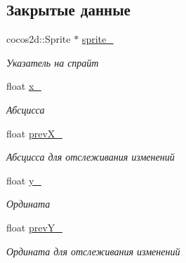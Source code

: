 \subsection*{Закрытые данные}
\begin{DoxyCompactItemize}
\item 
\mbox{\label{classrtm_1_1_world_object_ab371756fde7d223a4ff6fc72d42c9cf0}} 
cocos2d\+::\+Sprite $\ast$ \hyperlink{classrtm_1_1_world_object_ab371756fde7d223a4ff6fc72d42c9cf0}{sprite\+\_\+}
\begin{DoxyCompactList}\small\item\em Указатель на спрайт \end{DoxyCompactList}\item 
\mbox{\label{classrtm_1_1_world_object_a719b4bdf8eeca018f95ff42d0599944e}} 
float \hyperlink{classrtm_1_1_world_object_a719b4bdf8eeca018f95ff42d0599944e}{x\+\_\+}
\begin{DoxyCompactList}\small\item\em Абсцисса \end{DoxyCompactList}\item 
\mbox{\label{classrtm_1_1_world_object_ab66518f51a9b063e94f4e082789fa032}} 
float \hyperlink{classrtm_1_1_world_object_ab66518f51a9b063e94f4e082789fa032}{prev\+X\+\_\+}
\begin{DoxyCompactList}\small\item\em Абсцисса для отслеживания изменений \end{DoxyCompactList}\item 
\mbox{\label{classrtm_1_1_world_object_a5d4541d2f052555a0ce07001da6fd04f}} 
float \hyperlink{classrtm_1_1_world_object_a5d4541d2f052555a0ce07001da6fd04f}{y\+\_\+}
\begin{DoxyCompactList}\small\item\em Ордината \end{DoxyCompactList}\item 
\mbox{\label{classrtm_1_1_world_object_aa9b38c50c7900db0fa7dec8c9a8d9086}} 
float \hyperlink{classrtm_1_1_world_object_aa9b38c50c7900db0fa7dec8c9a8d9086}{prev\+Y\+\_\+}
\begin{DoxyCompactList}\small\item\em Ордината для отслеживания изменений \end{DoxyCompactList}\item 

\end{DoxyCompactItemize}

